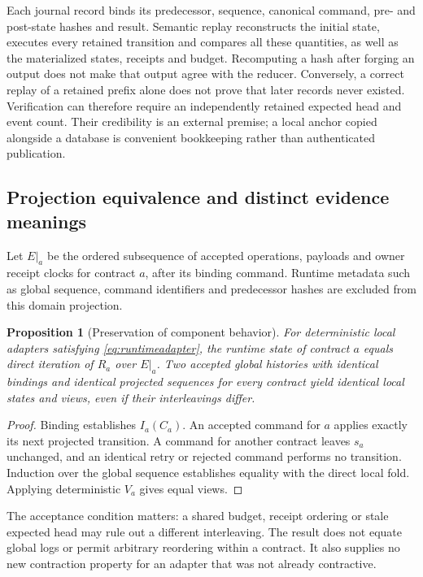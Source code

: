 \documentclass[11pt,a4paper]{article}
\newtheorem{proposition}[theorem]{Proposition}
\theoremstyle{definition}\newtheorem{definition}[theorem]{Definition}
\begin{document}
Each journal record binds its predecessor, sequence, canonical command, pre- and post-state hashes and result. Semantic replay reconstructs the initial state, executes every retained transition and compares all these quantities, as well as the materialized states, receipts and budget. Recomputing a hash after forging an output does not make that output agree with the reducer. Conversely, a correct replay of a retained prefix alone does not prove that later records never existed. Verification can therefore require an independently retained expected head and event count. Their credibility is an external premise; a local anchor copied alongside a database is convenient bookkeeping rather than authenticated publication.

\subsection{Projection equivalence and distinct evidence meanings}
Let $E|_a$ be the ordered subsequence of accepted operations, payloads and owner receipt clocks for contract $a$, after its binding command. Runtime metadata such as global sequence, command identifiers and predecessor hashes are excluded from this domain projection.

\begin{proposition}[Preservation of component behavior]\label{prop:runtimeprojection}
For deterministic local adapters satisfying \eqref{eq:runtimeadapter}, the runtime state of contract $a$ equals direct iteration of $R_a$ over $E|_a$. Two accepted global histories with identical bindings and identical projected sequences for every contract yield identical local states and views, even if their interleavings differ.
\end{proposition}
\begin{proof}
Binding establishes $I_a(C_a)$. An accepted command for $a$ applies exactly its next projected transition. A command for another contract leaves $s_a$ unchanged, and an identical retry or rejected command performs no transition. Induction over the global sequence establishes equality with the direct local fold. Applying deterministic $V_a$ gives equal views.
\end{proof}
The acceptance condition matters: a shared budget, receipt ordering or stale expected head may rule out a different interleaving. The result does not equate global logs or permit arbitrary reordering within a contract. It also supplies no new contraction property for an adapter that was not already contractive.
\end{document}
